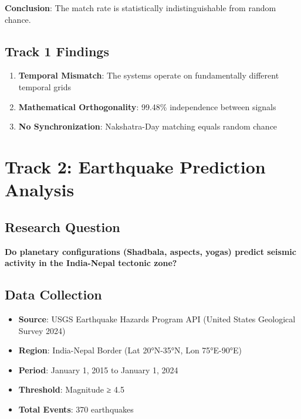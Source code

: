 \documentclass[
  11pt,
  a4paper,
  oneside,
  openany]{article}
\providecommand{\tightlist}{%
  \setlength{\itemsep}{0pt}\setlength{\parskip}{0pt}}\usepackage{longtable,booktabs,array}
\begin{document}
\textbf{Conclusion}: The match rate is statistically indistinguishable
from random chance.

\subsection{Track 1 Findings}\label{track-1-findings}

\begin{enumerate}
\def\labelenumi{\arabic{enumi}.}
\tightlist
\item
  \textbf{Temporal Mismatch}: The systems operate on fundamentally
  different temporal grids
\item
  \textbf{Mathematical Orthogonality}: 99.48\% independence between
  signals
\item
  \textbf{No Synchronization}: Nakshatra-Day matching equals random
  chance
\end{enumerate}

\section{Track 2: Earthquake Prediction
Analysis}\label{track-2-earthquake-prediction-analysis}

\subsection{Research Question}\label{research-question-1}

\textbf{Do planetary configurations (Shadbala, aspects, yogas) predict
seismic activity in the India-Nepal tectonic zone?}

\subsection{Data Collection}\label{data-collection-1}

\begin{itemize}
\tightlist
\item
  \textbf{Source}: USGS Earthquake Hazards Program API (United States
  Geological Survey 2024)
\item
  \textbf{Region}: India-Nepal Border (Lat 20°N-35°N, Lon 75°E-90°E)
\item
  \textbf{Period}: January 1, 2015 to January 1, 2024
\item
  \textbf{Threshold}: Magnitude ≥ 4.5
\item
  \textbf{Total Events}: 370 earthquakes
\end{itemize}
\end{document}

